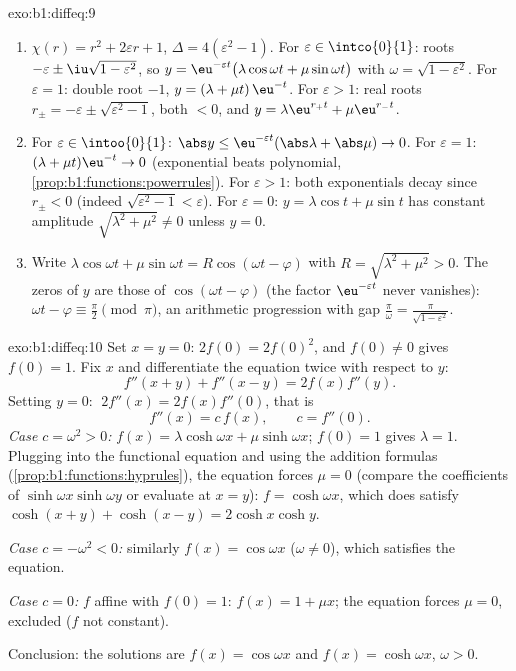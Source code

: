 \begin{solution}{exo:b1:diffeq:9}
\begin{enumerate}
  \item $\chi(r) = r^2 + 2\varepsilon r + 1$, $\Delta = 4(\varepsilon^2
        - 1)$.
        For $\varepsilon \in \intco{0}{1}$: roots $-\varepsilon \pm
        \iu\sqrt{1 - \varepsilon^2}$, so
        $y = \eu^{-\varepsilon t}\bigl(\lambda\cos\omega t +
        \mu\sin\omega t\bigr)$ with $\omega = \sqrt{1 -
        \varepsilon^2}$.
        For $\varepsilon = 1$: double root $-1$, $y = (\lambda + \mu
        t)\,\eu^{-t}$.
        For $\varepsilon > 1$: real roots $r_\pm = -\varepsilon \pm
        \sqrt{\varepsilon^2 - 1}$, both $< 0$, and $y =
        \lambda\eu^{r_+t} + \mu\eu^{r_-t}$.
  \item For $\varepsilon \in \intoo{0}{1}$: $\abs y \leq
        \eu^{-\varepsilon t}(\abs\lambda + \abs\mu) \to 0$. For
        $\varepsilon = 1$: $(\lambda + \mu t)\eu^{-t} \to 0$
        (exponential beats polynomial,
        \cref{prop:b1:functions:powerrules}). For $\varepsilon > 1$:
        both exponentials decay since $r_\pm < 0$ (indeed
        $\sqrt{\varepsilon^2 - 1} < \varepsilon$). For $\varepsilon =
        0$: $y = \lambda\cos t + \mu\sin t$ has constant amplitude
        $\sqrt{\lambda^2 + \mu^2} \neq 0$ unless $y = 0$.
  \item Write $\lambda\cos\omega t + \mu\sin\omega t =
        R\cos(\omega t - \varphi)$ with $R = \sqrt{\lambda^2 + \mu^2}
        > 0$. The zeros of $y$ are those of $\cos(\omega t -
        \varphi)$ (the factor $\eu^{-\varepsilon t}$ never
        vanishes): $\omega t - \varphi \equiv \frac\pi2 \pmod \pi$,
        an arithmetic progression with gap $\frac{\pi}{\omega} =
        \frac{\pi}{\sqrt{1 - \varepsilon^2}}$.
\end{enumerate}
\end{solution}

\begin{solution}{exo:b1:diffeq:10}
Set $x = y = 0$: $2f(0) = 2f(0)^2$, and $f(0) \neq 0$ gives $f(0) =
1$. Fix $x$ and differentiate the equation twice with respect to $y$:
\[
f''(x+y) + f''(x-y) = 2 f(x) f''(y) .
\]
Setting $y = 0$: $\;2f''(x) = 2 f(x) f''(0)$, that is
\[
f''(x) = c\,f(x), \qquad c = f''(0).
\]
\emph{Case $c = \omega^2 > 0$:} $f(x) = \lambda\cosh\omega x +
\mu\sinh\omega x$; $f(0) = 1$ gives $\lambda = 1$. Plugging into the
functional equation and using the addition formulas
(\cref{prop:b1:functions:hyprules}), the equation forces $\mu = 0$
(compare the coefficients of $\sinh\omega x \sinh\omega y$ or
evaluate at $x = y$): $f = \cosh\omega x$, which does satisfy
$\cosh(x+y) + \cosh(x-y) = 2\cosh x\cosh y$.

\emph{Case $c = -\omega^2 < 0$:} similarly $f(x) = \cos\omega x$
($\omega \neq 0$), which satisfies the equation.

\emph{Case $c = 0$:} $f$ affine with $f(0) = 1$: $f(x) = 1 + \mu x$;
the equation forces $\mu = 0$, excluded ($f$ not constant).

Conclusion: the solutions are $f(x) = \cos\omega x$ and $f(x) =
\cosh\omega x$, $\omega > 0$.
\end{solution}

